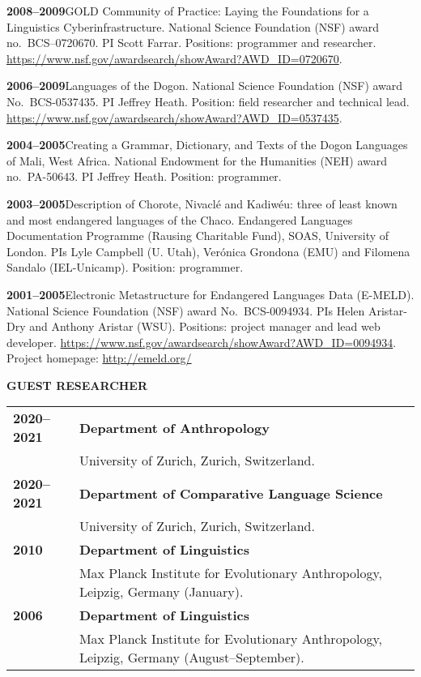 \documentclass[11pt]{article}
\newcommand{\hangpara}{
 \setlength{\parindent}{0in} %
 \hangindent=0.42in %
}
\begin{document}
\vskip 6pt
\hangpara
{\bf 2008--2009}\hspace{1ex}GOLD Community of Practice: Laying the Foundations for a Linguistics Cyberinfrastructure. National Science Foundation (NSF) award no.\ BCS--0720670. PI Scott Farrar. Positions: programmer and researcher. \url{https://www.nsf.gov/awardsearch/showAward?AWD_ID=0720670}. %

\vskip 6pt
\hangpara
{\bf 2006--2009}\hspace{1ex}Languages of the Dogon. National Science Foundation (NSF) award No.\ BCS-0537435. PI Jeffrey Heath. Position: field researcher and technical lead. \url{https://www.nsf.gov/awardsearch/showAward?AWD_ID=0537435}.

\vskip 6pt
\hangpara
{\bf 2004--2005}\hspace{1ex}Creating a Grammar, Dictionary, and Texts of the Dogon Languages of Mali, West Africa. National Endowment for the Humanities (NEH) award no.\ PA-50643. PI Jeffrey Heath. Position: programmer.

\vskip 6pt
\hangpara
{\bf 2003--2005}\hspace{1ex}Description of Chorote, Nivacl{\'e} and Kadiw{\'e}u: three of least known and most endangered languages of the Chaco. Endangered Languages Documentation Programme (Rausing Charitable Fund), SOAS, University of London. PIs Lyle Campbell (U. Utah), Ver{\'o}nica Grondona (EMU) and Filomena Sandalo (IEL-Unicamp). Position: programmer.

\vskip 6pt
\hangpara
{\bf 2001--2005}\hspace{1ex}Electronic Metastructure for Endangered Languages Data (E-MELD). National Science Foundation (NSF) award No.\ BCS-0094934. PIs Helen Aristar-Dry and Anthony Aristar (WSU). Positions: project manager and lead web developer. \url{https://www.nsf.gov/awardsearch/showAward?AWD_ID=0094934}. Project homepage: \url{http://emeld.org/}

\clearpage

\vskip 20pt
\begin{flushleft}
{\bf GUEST RESEARCHER}
\end{flushleft}
\begin{tabular}{lp{5.5in}}
\bf 2020--2021	& {\bf Department of Anthropology} \\
& University of Zurich, Zurich, Switzerland. \\
\bf 2020--2021	& {\bf Department of Comparative Language Science} \\
& University of Zurich, Zurich, Switzerland. \\
\bf 2010	& {\bf Department of Linguistics}\\
& Max Planck Institute for Evolutionary Anthropology, Leipzig, Germany (January).  \\
\bf 2006	& {\bf Department of Linguistics}\\
& Max Planck Institute for Evolutionary Anthropology, Leipzig, Germany (August--September).  \\
\end{tabular}
\end{document}
